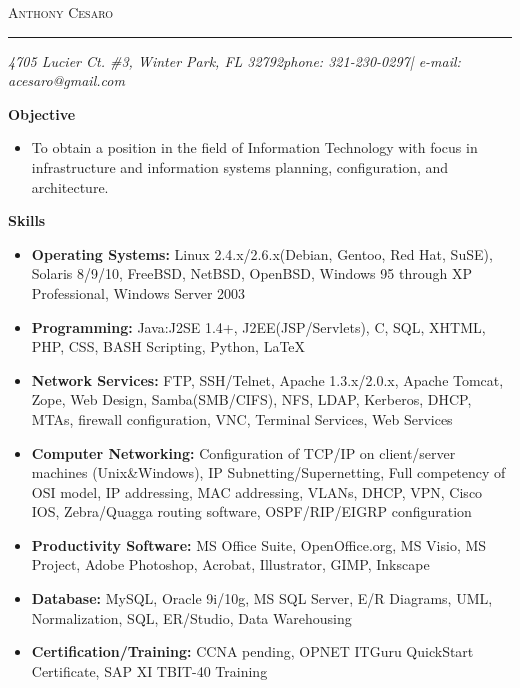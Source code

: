 \documentclass[10pt,oneside]{article}
\makeatletter
\newcommand{\name}{Anthony Cesaro}
\newcommand{\email}{acesaro@gmail.com}
\newcommand{\addr}{4705 Lucier Ct. \#3, Winter Park, FL 32792}
\newcommand{\phone}{321-230-0297}
\newcommand{\bigname}[1]{
	\begin{flushleft}\selectfont\Large\scshape#1\end{flushleft}
}
\newenvironment{ressection}[1]{
	\vspace{4pt}
	\textbf{\selectfont\normalsize#1}
	\begin{itemize}
	\vspace{3pt}
}{
	\end{itemize}
}
\newcommand{\resitem}[1]{
	\vspace{-4pt}
	\item \begin{flushleft} #1 \end{flushleft}
}
\makeatother
\begin{document}
 \selectfont

\bigname{\name}

\vspace{-8pt} \rule{\textwidth}{1pt}

\vspace{-1pt} {\small\itshape \addr \hfill phone: \phone | e-mail: \email}

\vspace{8 pt}



\begin{ressection}{Objective}

	\resitem{To obtain a position in the field of Information Technology with focus in infrastructure and information systems planning, configuration, and architecture.}

\end{ressection}


\begin{ressection}{Skills}

	\resitem{\textbf{Operating Systems:} Linux 2.4.x/2.6.x(Debian, Gentoo, Red Hat, SuSE), Solaris 8/9/10, FreeBSD, NetBSD, OpenBSD, Windows 95 through XP Professional, Windows Server 2003}
	
	\resitem{\textbf{Programming:} Java:J2SE 1.4+, J2EE(JSP/Servlets), C, SQL, XHTML, PHP, CSS, BASH Scripting, Python, \LaTeX}

	\resitem{\textbf{Network Services:} FTP, SSH/Telnet, Apache 1.3.x/2.0.x, Apache Tomcat, Zope, Web Design, Samba(SMB/CIFS), NFS, LDAP, Kerberos, DHCP, MTAs, firewall configuration, VNC, Terminal Services, Web Services}

	\resitem{\textbf{Computer Networking:} Configuration of TCP/IP on client/server machines (Unix\&Windows), IP Subnetting/Supernetting, Full competency of OSI model, IP addressing, MAC addressing, VLANs, DHCP, VPN, Cisco IOS, Zebra/Quagga routing software, OSPF/RIP/EIGRP configuration}

	\resitem{\textbf{Productivity Software:} MS Office Suite, OpenOffice.org, MS Visio, MS Project, Adobe Photoshop, Acrobat, Illustrator, GIMP, Inkscape}

	\resitem{\textbf{Database:} MySQL, Oracle 9i/10g, MS SQL Server, E/R Diagrams, UML, Normalization, SQL, ER/Studio, Data Warehousing}

	\resitem{\textbf{Certification/Training:} CCNA pending, OPNET ITGuru QuickStart Certificate, SAP XI TBIT-40 Training}
	
\end{ressection}
\end{document}
